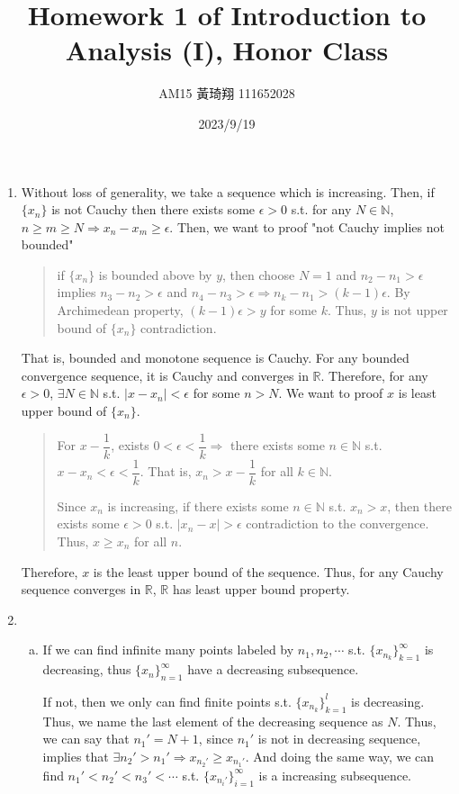 \documentclass[12pt]{article}
\title{Homework 1 of Introduction to Analysis (I), Honor Class}
\author{AM15 黃琦翔 111652028}
\date{2023/9/19}
\begin{document}
\maketitle
\begin{enumerate}
    \item Without loss of generality, we take a sequence which is increasing. 
    Then, if $\lbrace x_n\rbrace$ is not Cauchy then there exists some $\epsilon > 0$ s.t. for any $N \in \mathbb{N}$, $n \geq m \geq N\Rightarrow x_n - x_m \geq \epsilon$.
    Then, we want to proof "not Cauchy implies not bounded"\begin{quote}
        if $\lbrace x_n\rbrace$ is bounded above by $y$, then choose $N = 1$ and $n_2 - n_1 > \epsilon$ implies $n_3 - n_2 > \epsilon$ and $n_4 - n_3 > \epsilon\Rightarrow n_k - n_1 > (k-1)\epsilon$.
        By Archimedean property, $(k-1)\epsilon > y$ for some $k$. Thus, $y$ is not upper bound of $\lbrace x_n \rbrace$ contradiction.
    \end{quote}
    That is, bounded and monotone sequence is Cauchy.
    For any bounded convergence sequence, it is Cauchy and converges in $\mathbb{R}$.
    Therefore, for any $\epsilon > 0$, $\exists N \in \mathbb{N}$ s.t. $|x - x_n| < \epsilon$ for some $n > N$.
    We want to proof $x$ is least upper bound of $\lbrace x_n\rbrace$.\begin{quote}
        For $x - \dfrac{1}{k}$, exists $0 < \epsilon < \dfrac{1}{k}\Rightarrow$ there exists some $n \in \mathbb{N}$ s.t. $x - x_n < \epsilon < \dfrac{1}{k}$.
        That is, $x_n > x-\dfrac{1}{k}$ for all $k \in \mathbb{N}$.

        Since $x_n$ is increasing, if there exists some $n \in\mathbb{N}$ s.t. $x_n > x$, 
        then there exists some $\epsilon > 0$ s.t. $|x_n -x| > \epsilon$ contradiction to the convergence.
        Thus, $x \geq x_n$ for all $n$.
    \end{quote}
    Therefore, $x$ is the least upper bound of the sequence.
    Thus, for any Cauchy sequence converges in $\mathbb{R}$, $\mathbb{R}$ has least upper bound property.

    \item \begin{enumerate}[(a)]
        \item If we can find infinite many points labeled by $n_1, n_2, \cdots$ s.t. $\lbrace x_{n_k}\rbrace_{k=1}^\infty$ is decreasing, thus $\lbrace x_n\rbrace_{n=1}^\infty$ have a decreasing subsequence.
        
        If not, then we only can find finite points s.t. $\lbrace x_{n_k}\rbrace_{k=1}^l$ is decreasing. Thus, we name the last element of the decreasing sequence as $N$.
        Thus, we can say that $n_1' = N + 1$, since $n_1'$ is not in decreasing sequence, implies that $\exists n_2' > n_1' \Rightarrow x_{n_2'} \geq x_{n_1'}$.
        And doing the same way,  we can find $n_1' < n_2' < n_3' < \cdots$ s.t. $\lbrace x_{n_i'}\rbrace_{i=1}^\infty$ is a increasing subsequence.


\end{enumerate}
\end{enumerate}
\end{document}
